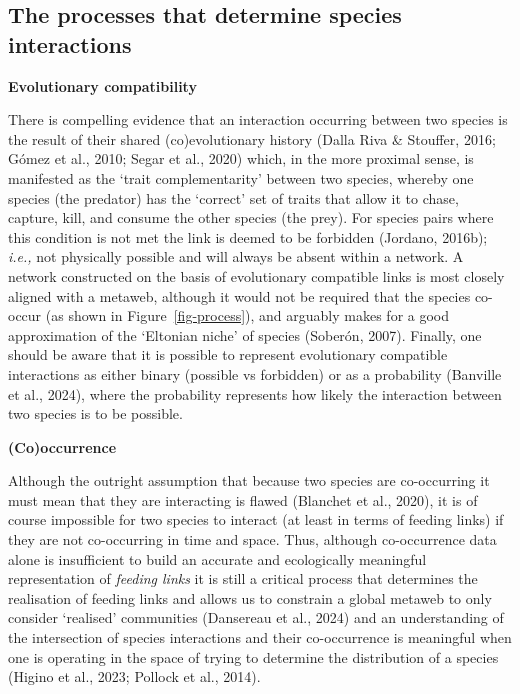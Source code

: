 \documentclass[
]{article}
\begin{document}
\subsection{The processes that determine species
interactions}\label{the-processes-that-determine-species-interactions}

\textbf{Evolutionary compatibility}

There is compelling evidence that an interaction occurring between two
species is the result of their shared (co)evolutionary history (Dalla
Riva \& Stouffer, 2016; Gómez et al., 2010; Segar et al., 2020) which,
in the more proximal sense, is manifested as the `trait complementarity'
between two species, whereby one species (the predator) has the
`correct' set of traits that allow it to chase, capture, kill, and
consume the other species (the prey). For species pairs where this
condition is not met the link is deemed to be forbidden (Jordano,
2016b); \emph{i.e.,} not physically possible and will always be absent
within a network. A network constructed on the basis of evolutionary
compatible links is most closely aligned with a metaweb, although it
would not be required that the species co-occur (as shown in
Figure~\ref{fig-process}), and arguably makes for a good approximation
of the `Eltonian niche' of species (Soberón, 2007). Finally, one should
be aware that it is possible to represent evolutionary compatible
interactions as either binary (possible vs forbidden) or as a
probability (Banville et al., 2024), where the probability represents
how likely the interaction between two species is to be possible.

\textbf{(Co)occurrence}

Although the outright assumption that because two species are
co-occurring it must mean that they are interacting is flawed (Blanchet
et al., 2020), it is of course impossible for two species to interact
(at least in terms of feeding links) if they are not co-occurring in
time and space. Thus, although co-occurrence data alone is insufficient
to build an accurate and ecologically meaningful representation of
\emph{feeding links} it is still a critical process that determines the
realisation of feeding links and allows us to constrain a global metaweb
to only consider `realised' communities (Dansereau et al., 2024) and an
understanding of the intersection of species interactions and their
co-occurrence is meaningful when one is operating in the space of trying
to determine the distribution of a species (Higino et al., 2023; Pollock
et al., 2014).
\end{document}
